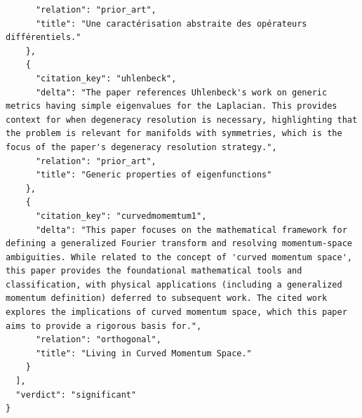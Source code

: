 \documentclass[11pt]{article}
\begin{document}
\begin{verbatim}
      "relation": "prior_art",
      "title": "Une caractérisation abstraite des opérateurs différentiels."
    },
    {
      "citation_key": "uhlenbeck",
      "delta": "The paper references Uhlenbeck's work on generic metrics having simple eigenvalues for the Laplacian. This provides context for when degeneracy resolution is necessary, highlighting that the problem is relevant for manifolds with symmetries, which is the focus of the paper's degeneracy resolution strategy.",
      "relation": "prior_art",
      "title": "Generic properties of eigenfunctions"
    },
    {
      "citation_key": "curvedmomemtum1",
      "delta": "This paper focuses on the mathematical framework for defining a generalized Fourier transform and resolving momentum-space ambiguities. While related to the concept of 'curved momentum space', this paper provides the foundational mathematical tools and classification, with physical applications (including a generalized momentum definition) deferred to subsequent work. The cited work explores the implications of curved momentum space, which this paper aims to provide a rigorous basis for.",
      "relation": "orthogonal",
      "title": "Living in Curved Momentum Space."
    }
  ],
  "verdict": "significant"
}
\end{verbatim}
\end{document}

